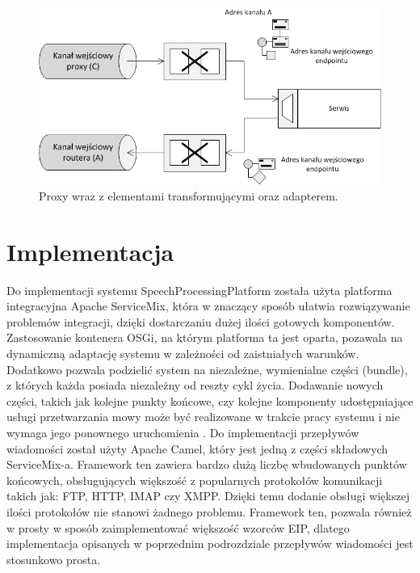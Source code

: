 \begin{figure}[!h]
	\centering
	\includegraphics[scale=0.8]{proxy_layer_flow.png}
	\caption{Proxy wraz z elementami transformującymi oraz adapterem. }\label{fig:servis_proxy}
\end{figure}


\section{Implementacja}

Do implementacji systemu SpeechProcessingPlatform została użyta platforma integracyjna Apache ServiceMix, która w znaczący sposób ułatwia rozwiązywanie problemów integracji, dzięki dostarczaniu dużej ilości gotowych komponentów. Zastosowanie kontenera OSGi, na którym platforma ta jest oparta, pozawala na dynamiczną adaptację systemu w zależności od zaistniałych warunków. Dodatkowo pozwala podzielić system na niezależne, wymienialne części (bundle), z których każda posiada niezależny od reszty cykl życia. Dodawanie nowych części, takich jak kolejne punkty końcowe, czy kolejne komponenty udostępniające usługi przetwarzania mowy może być realizowane w trakcie pracy systemu i nie wymaga jego ponownego uruchomienia \cite{hall2011}. Do implementacji przepływów wiadomości został użyty Apache Camel, który jest jedną z części składowych ServiceMix-a. Framework ten zawiera bardzo dużą liczbę wbudowanych punktów końcowych, obsługujących większość z popularnych protokołów komunikacji takich jak: FTP, HTTP, IMAP czy XMPP. Dzięki temu dodanie obsługi większej ilości protokołów nie stanowi żadnego problemu. Framework ten, pozwala również w prosty w sposób zaimplementować większość wzorców EIP, dlatego implementacja opisanych w poprzednim podrozdziale przepływów wiadomości jest stosunkowo prosta.

